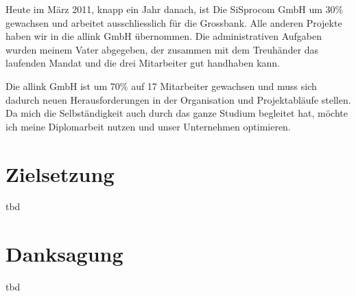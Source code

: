 Heute im März 2011, knapp ein Jahr danach, ist Die SiSprocom GmbH um 30\% 
gewachsen und arbeitet ausschliesslich für die Grossbank. Alle anderen Projekte
haben wir in die allink GmbH übernommen. Die administrativen Aufgaben wurden
meinem Vater abgegeben, der zusammen mit dem Treuhänder das laufenden
Mandat und die drei Mitarbeiter gut handhaben kann.

Die allink GmbH ist um 70\% auf 17 Mitarbeiter gewachsen und muss sich dadurch
neuen Herausforderungen in der Organisation und Projektabläufe stellen. Da
mich die Selbständigkeit auch durch das ganze Studium begleitet hat, möchte 
ich meine Diplomarbeit nutzen und unser Unternehmen optimieren.

\section{Zielsetzung}
tbd

\section{Danksagung}
tbd
